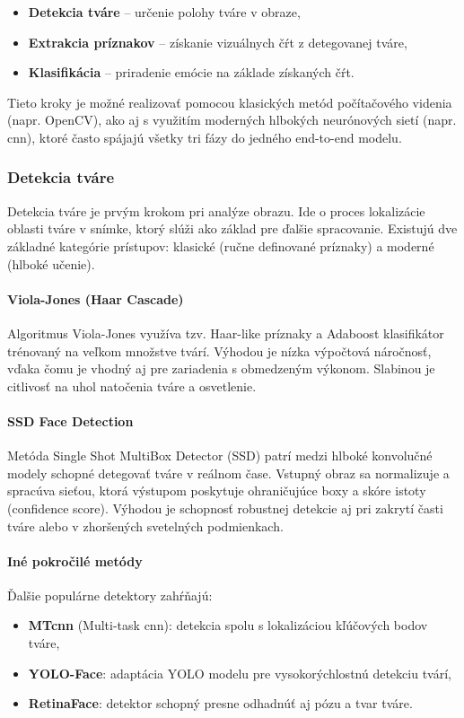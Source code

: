 \begin{itemize}
    \item \textbf{Detekcia tváre} -- určenie polohy tváre v obraze,
    \item \textbf{Extrakcia príznakov} -- získanie vizuálnych čŕt z detegovanej tváre,
    \item \textbf{Klasifikácia} -- priradenie emócie na základe získaných čŕt.
\end{itemize}

Tieto kroky je možné realizovať pomocou klasických metód počítačového videnia (napr. OpenCV), ako aj s využitím moderných hlbokých neurónových sietí (napr. \gls{cnn}), ktoré často spájajú všetky tri fázy do jedného end-to-end modelu.

\subsubsection{Detekcia tváre}
Detekcia tváre je prvým krokom pri analýze obrazu. Ide o proces lokalizácie oblasti tváre v snímke, ktorý slúži ako základ pre ďalšie spracovanie. Existujú dve základné kategórie prístupov: klasické (ručne definované príznaky) a moderné (hlboké učenie).

\paragraph{Viola-Jones (Haar Cascade)}
Algoritmus Viola-Jones využíva tzv. Haar-like príznaky a Adaboost klasifikátor trénovaný na veľkom množstve tvárí. Výhodou je nízka výpočtová náročnosť, vďaka čomu je vhodný aj pre zariadenia s obmedzeným výkonom. Slabinou je citlivosť na uhol natočenia tváre a osvetlenie.

\paragraph{SSD Face Detection}
Metóda Single Shot MultiBox Detector (SSD) patrí medzi hlboké konvolučné modely schopné detegovať tváre v reálnom čase. Vstupný obraz sa normalizuje a spracúva sieťou, ktorá výstupom poskytuje ohraničujúce boxy a skóre istoty (confidence score). Výhodou je schopnosť robustnej detekcie aj pri zakrytí časti tváre alebo v zhoršených svetelných podmienkach.

\paragraph{Iné pokročilé metódy}
Ďalšie populárne detektory zahŕňajú:
\begin{itemize}
    \item \textbf{MT\gls{cnn}} (Multi-task \gls{cnn}): detekcia spolu s lokalizáciou kľúčových bodov tváre,
    \item \textbf{YOLO-Face}: adaptácia YOLO modelu pre vysokorýchlostnú detekciu tvárí,
    \item \textbf{RetinaFace}: detektor schopný presne odhadnúť aj pózu a tvar tváre.
\end{itemize}

